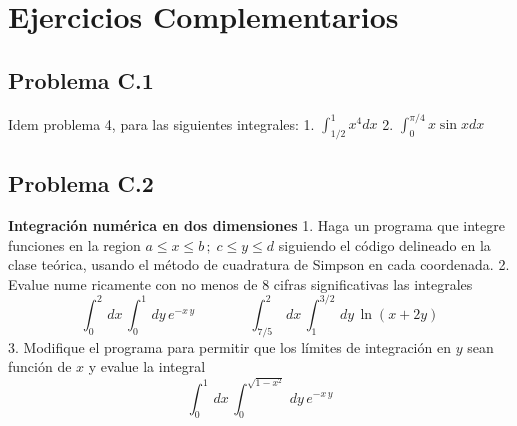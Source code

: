 \documentclass[11pt]{article}
\begin{document}
    \hypertarget{ejercicios-complementarios}{%
\section{Ejercicios Complementarios}\label{ejercicios-complementarios}}

    \hypertarget{problema-c.1}{%
\subsection{Problema C.1}\label{problema-c.1}}

Idem problema 4, para las siguientes integrales: 1.
\(\int_{1/2}^1 x^4 dx\) 2. \(\int_0^{\pi/4} x \sin x dx\)

    \hypertarget{problema-c.2}{%
\subsection{Problema C.2}\label{problema-c.2}}

\textbf{Integración numérica en dos dimensiones} 1. Haga un programa que
integre funciones en la region \(a\le x \le b\,;\;c \le y \le d\)
siguiendo el código delineado en la clase teórica, usando el método de
cuadratura de Simpson en cada coordenada. 2. Evalue nume ricamente con
no menos de 8 cifras significativas las integrales \[
\int_0^2\,dx\, \int_0^1\,dy\, e^{-x\,y} \;\;\;\;\;\;\;\;\;\;\;\;\;\;
\int_{7/5}^2\,dx\, \int_1^{3/2}\,dy\, \ln{(x+2 y)}
\] 3. Modifique el programa para permitir que los límites de integración
en \(y\) sean función de \(x\) y evalue la integral \[
\int_0^1\,dx\, \int_0^{\sqrt{1-x^2}}\,dy\, e^{-x\,y} 
\]


    
    
    
    
\end{document}
